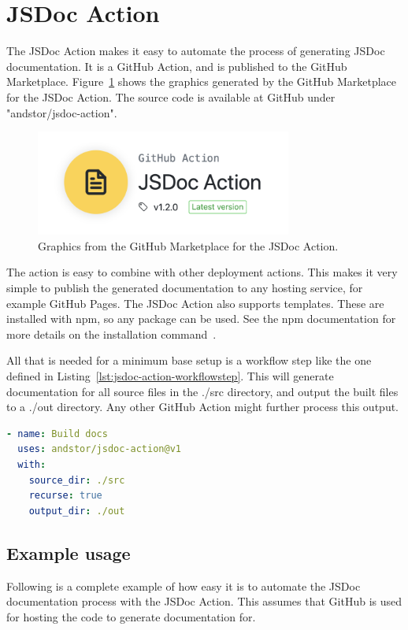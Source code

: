 \section{JSDoc Action}
\label{sec:result-jsdoc-action}
The JSDoc Action makes it easy to automate the process of generating JSDoc documentation. It is a GitHub Action, and is published to the GitHub Marketplace. Figure~\ref{fig:jsdoc-action-logo} shows the graphics generated by the GitHub Marketplace for the JSDoc Action. The source code is available at GitHub under "andstor/jsdoc-action".
\begin{figure}[htp]
    \centering
    \includegraphics[width=0.75\textwidth]{sections/result/figures/jsdoc-action-logo.png}
    \caption{Graphics from the GitHub Marketplace for the JSDoc Action.}
    \label{fig:jsdoc-action-logo}
\end{figure}

The action is easy to combine with other deployment actions. This makes it very simple to publish the generated documentation to any hosting service, for example GitHub Pages. The JSDoc Action also supports templates. These are installed with npm, so any package can be used. See the npm documentation for more details on the installation command~\cite{npm-install-docs}.

All that is needed for a minimum base setup is a workflow step like the one defined in Listing~\ref{lst:jsdoc-action-workflowstep}. This will generate documentation for all source files in the ./src directory, and output the built files to a ./out directory. Any other GitHub Action might further process this output.
\begin{lstlisting}[language=yaml,caption={Basic JSDoc Action workflow step},label={lst:jsdoc-action-workflowstep}]
- name: Build docs
  uses: andstor/jsdoc-action@v1
  with:
    source_dir: ./src
    recurse: true
    output_dir: ./out
\end{lstlisting}

\subsection{Example usage}
Following is a complete example of how easy it is to automate the JSDoc documentation process with the JSDoc Action. This assumes that GitHub is used for hosting the code to generate documentation for.

